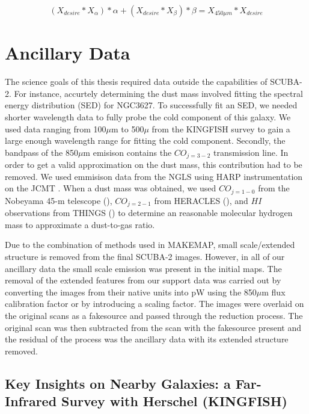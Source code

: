 \begin{equation} \label{eq:GBSmethod}
  \left(X_{desire} \ast X_{\alpha}\right)*\alpha + \left(X_{desire} \ast X_{\beta}\right)*\beta = X_{450\mu m} \ast X_{desire}
\end{equation}

\section{Ancillary Data}

The science goals of this thesis required data outside the capabilities of SCUBA-2.  For instance, accurtely determining the dust mass involved fitting the spectral energy distribution (SED) for NGC3627.  To successfully fit an SED, we needed shorter wavelength data to fully probe the cold component of this galaxy. We used data ranging from 100$\mu$m to 500$\mu$ from the KINGFISH survey \citet{kennicutt2011} to gain a large enough wavelength range for fitting the cold component.  Secondly, the bandpass of the 850$\mu$m emisison contains the $CO_{j=3-2}$ transmission line.  In order to get a valid approximation on the dust mass, this contribution had to be removed.  We used emmisison data from the NGLS using HARP instrumentation on the JCMT \citet{wilson2012}.  When a dust mass was obtained, we used $CO_{j=1-0}$ from the Nobeyama 45-m telescope (\citet{kuno2007}), $CO_{j=2-1}$ from HERACLES (\protect\citet{leroy2009}), and $HI$ observations from THINGS (\protect\citet{walter2008}) to determine an reasonable molecular hydrogen mass to approximate a dust-to-gas ratio.

Due to the combination of methods used in MAKEMAP, small scale/extended structure is removed from the final SCUBA-2 images.  However, in all of our ancillary data the small scale emission was present in the initial maps.  The removal of the extended features from our support data was carried out by converting the images from their native units into pW using the 850$\mu$m flux calibration factor or by introducing a scaling factor.  The images were overlaid on the original scans as a fakesource and passed through the reduction process.  The original scan was then subtracted from the scan with the fakesource present and the residual of the process was the ancillary data with its extended structure removed.

\subsection{Key Insights on Nearby Galaxies: a Far-Infrared Survey with Herschel (KINGFISH)}

